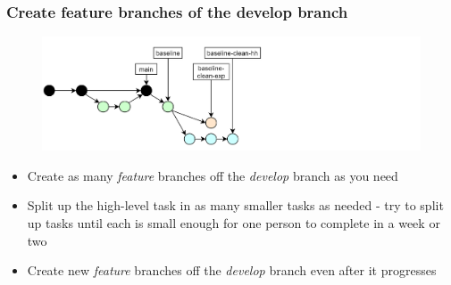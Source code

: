\documentclass[aspectratio=169]{beamer} %
\begin{document}
\begin{frame}
	\frametitle{Create feature branches of the develop branch}

	\vspace{-.5cm}
	\begin{minipage}[t][5cm][t]{\textwidth}
		\begin{figure}
			\centering
			\includegraphics[width=\textwidth]{./img/dime-gitflow-network-2-2.png}
		\end{figure}
	\end{minipage}

	\vspace{-.5cm}
	\begin{minipage}[t][5cm][t]{\textwidth}
		\begin{itemize}
			\setlength\itemsep{.5em}
			\item Create as many \textit{feature} branches off
			the \textit{develop} branch as you need
			\item Split up the high-level task in as many smaller tasks as needed
			- try to split up tasks until each is small enough
			for one person to complete in a week or two
			\item Create new \textit{feature} branches off
			the \textit{develop} branch even after it progresses
		\end{itemize}
	\end{minipage}
\end{frame}
\end{document}
